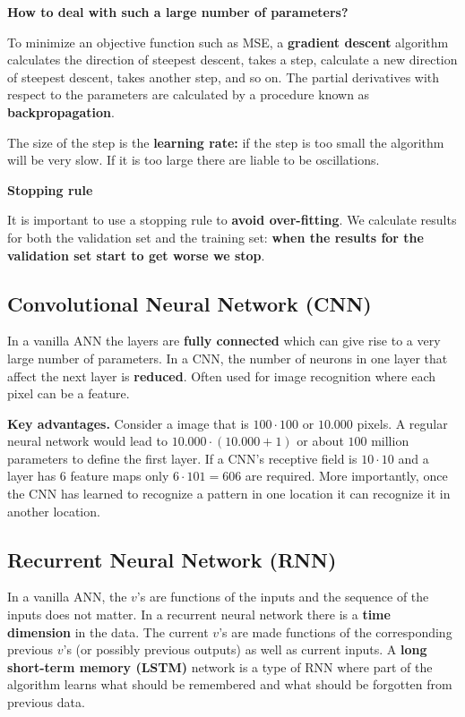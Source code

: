 \textbf{How to deal with such a large number of parameters?}

To minimize an objective function such as MSE, a \textbf{gradient descent} algorithm calculates the direction of steepest descent, takes a step, calculate a new direction of steepest descent, takes another step, and so on. The partial derivatives with respect to the parameters are calculated by a procedure known as \textbf{backpropagation}.

The size of the step is the \textbf{learning rate:} if the step is too small the algorithm will be very slow. If it is too large there are liable to be oscillations.

\textbf{Stopping rule}

It is important to use a stopping rule to \textbf{avoid over-fitting}. We calculate results for both the validation set and the training set: \textbf{when the results for the validation set start to get worse we stop}.

\subsection{Convolutional Neural Network (CNN)}

In a vanilla ANN the layers are \textbf{fully connected} which can give rise to a very large number of parameters. In a CNN, the number of neurons in one layer that affect the next layer is \textbf{reduced}. Often used for image recognition where each pixel can be a feature.

\textbf{Key advantages.} Consider a image that is $100 \cdot 100$ or $10.000$ pixels. A regular neural network would lead to $10.000\cdot(10.000+1)$ or about $100$ million parameters to define the first layer. If a CNN's receptive field is $10\cdot 10$ and a layer has $6$ feature maps only $6\cdot 101 = 606$ are required. More importantly, once the CNN has learned to recognize a pattern in one location it can recognize it in another location.


\subsection{Recurrent Neural Network (RNN)}

In a vanilla ANN, the $v$'s are functions of the inputs and the sequence of the inputs does not matter. In a recurrent neural network there is a \textbf{time dimension} in the data. The current $v$'s are made functions of the corresponding previous $v$'s (or possibly previous outputs) as well as current inputs. A \textbf{long short-term memory (LSTM)} network is a type of RNN where part of the algorithm learns what should be remembered and what should be forgotten from previous data.

